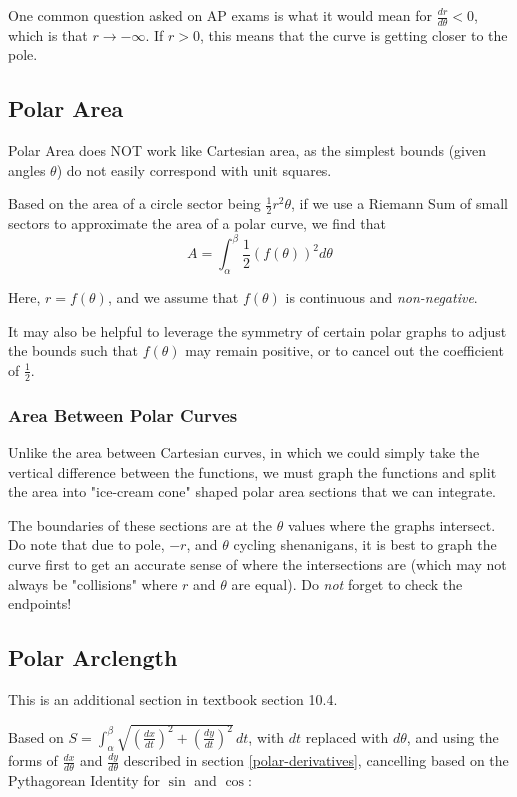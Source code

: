 \documentclass{article}
\begin{document}
One common question asked on AP exams is what it would mean for $\frac{dr}{d\theta} < 0$, which is that $r \to -\infty$. If $r > 0$, this means that the curve is getting closer to the pole.

\subsection{Polar Area}
Polar Area does NOT work like Cartesian area, as the simplest bounds (given angles $\theta$) do not easily correspond with unit squares.

Based on the area of a circle sector being $\frac{1}{2}r^2\theta$, if we use a Riemann Sum of small sectors to approximate the area of a polar curve, we find that
$$A = \int_{\alpha}^{\beta} \frac{1}{2} \left(f(\theta)\right)^2 d\theta$$

Here,  $r = f(\theta)$, and we assume that $f(\theta)$ is continuous and \emph{non-negative}.

It may also be helpful to leverage the symmetry of certain polar graphs to adjust the bounds such that $f(\theta)$ may remain positive, or to cancel out the coefficient of $\frac{1}{2}$.

\subsubsection{Area Between Polar Curves}
Unlike the area between Cartesian curves, in which we could simply take the vertical difference between the functions, we must graph the functions and split the area into "ice-cream cone" shaped polar area sections that we can integrate.

The boundaries of these sections are at the $\theta$ values where the graphs intersect. Do note that due to pole, $-r$, and $\theta$ cycling shenanigans, it is best to graph the curve first to get an accurate sense of where the intersections are (which may not always be "collisions" where $r$ and $\theta$ are equal). Do \emph{not} forget to check the endpoints!

\subsection{Polar Arclength}
This is an additional section in textbook section 10.4.

\vspace{.15in}
Based on $S = \int_{\alpha}^{\beta} \sqrt{\left(\frac{dx}{dt}\right)^2 + \left(\frac{dy}{dt}\right)^2} \,dt$, with $dt$ replaced with $d\theta$, and using the forms of $\frac{dx}{d\theta}$ and $\frac{dy}{d\theta}$ described in section \ref{polar-derivatives}, cancelling based on the Pythagorean Identity for $\sin$ and $\cos$:
\end{document}
